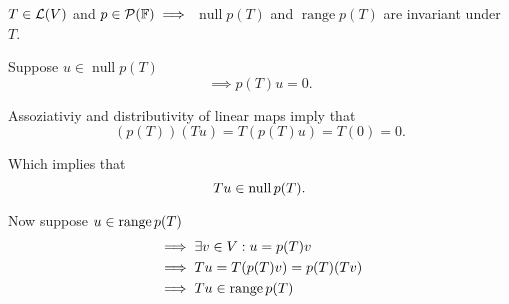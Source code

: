 \begin{thm} 
  \label{thm: null space and range of p(T) are invariant under T}
  $T \in \mathcal{L}(V)$ and $p\in \mathcal{P} (\mathbb{F}) \implies$
  $\operatorname{null} p(T)$ and $\operatorname{range} p(T)$ are invariant under $T$.
\end{thm}
\begin{prf}
  Suppose $u\in \operatorname{null} p(T)$
  \begin{equation}
    \implies p(T)u = 0. 
  \end{equation}
  
  Assoziativiy and distributivity of linear maps imply that 
  \begin{equation}
    (p(T))(Tu)=T(p(T)u)=T(0)=0.
  \end{equation}
  
  Which implies that
  \begin{equation}
    Tu \in \operatorname{null} p(T).
  \end{equation}
  
  Now suppose $u \in \operatorname{range} p(T)$
  \begin{equation}
    \begin{aligned}
      &\implies \exists v\in V: u=p(T)v \\
      &\implies Tu=T(p(T)v)=p(T)(Tv) \\
      &\implies Tu \in \operatorname{range} p(T)
    \end{aligned}
  \end{equation}
  \vspace{-1.1em}
\end{prf}